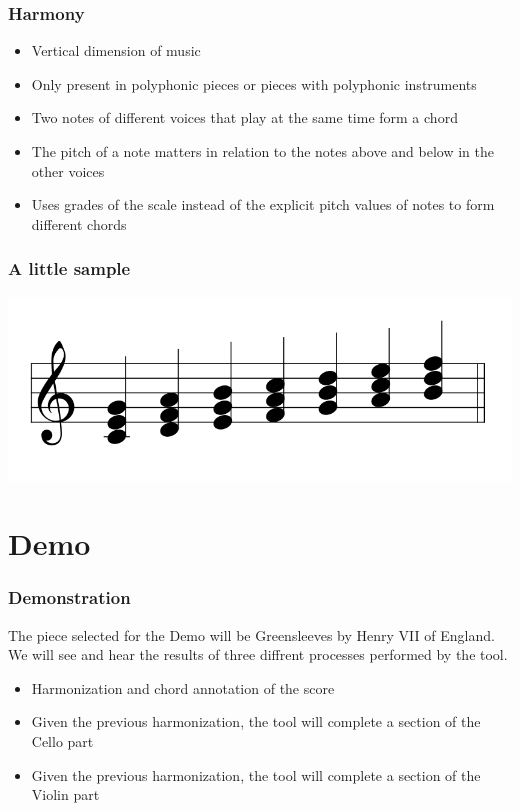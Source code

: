 \documentclass[english]{beamer}
\begin{document}
	\begin{frame}
		\frametitle{Harmony}
		\begin{itemize}
			\item Vertical dimension of music
			\item Only present in polyphonic pieces or pieces with polyphonic instruments
			\item Two notes of different voices that play at the same time form a chord
			\item The pitch of a note matters in relation to the notes above and below in the other voices
			\item Uses grades of the scale instead of the explicit pitch values of notes to form different chords
		\end{itemize}
	\end{frame}
	
	\begin{frame}
		\frametitle{A little sample}
		\includegraphics[width=\linewidth]{imagenes/C_chords.png}
	\end{frame}

\section{Demo}
	\begin{frame}
		\frametitle{Demonstration}
		The piece selected for the Demo will be Greensleeves by Henry VII of England. We will see and hear the results of three diffrent processes performed by the tool.
		\begin{itemize}
			\item Harmonization and chord annotation of the score
			\item Given the previous harmonization, the tool will complete a section of the Cello part
			\item Given the previous harmonization, the tool will complete a section of the Violin part
		\end{itemize}
	\end{frame}
\end{document}
